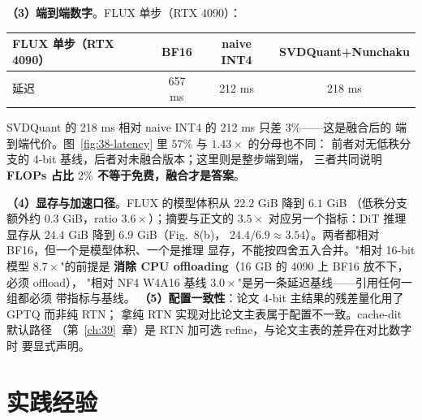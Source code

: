 \textbf{（3）端到端数字}。FLUX 单步（RTX 4090）：

\begin{center}\small
\begin{tabular}{@{}lccc@{}}
\toprule
FLUX 单步（RTX 4090） & BF16 & naive INT4 & SVDQuant+Nunchaku \\
\midrule
延迟 & 657 ms & 212 ms & 218 ms \\
\bottomrule
\end{tabular}
\end{center}

SVDQuant 的 218 ms 相对 naive INT4 的 212 ms 只差 $3\%$——这是融合后的
端到端代价。图~\ref{fig:38-latency} 里 $57\%$ 与 $1.43\times$ 的分母也不同：
前者对无低秩分支的 4-bit 基线，后者对未融合版本；这里则是整步端到端，
三者共同说明\textbf{FLOPs 占比 $2\%$ 不等于免费，融合才是答案}。

\textbf{（4）显存与加速口径}。FLUX 的模型体积从 $22.2$ GiB 降到 $6.1$ GiB
（低秩分支额外约 $0.3$ GiB，ratio $3.6\times$）；摘要与正文的 $3.5\times$
对应另一个指标：DiT 推理显存从 $24.4$ GiB 降到 $6.9$ GiB（Fig.~8(b)，
$24.4/6.9\approx3.54$）。两者都相对 BF16，但一个是模型体积、一个是推理
显存，不能按四舍五入合并。"相对 16-bit 模型 $8.7\times$"的前提是
\textbf{消除 CPU offloading}（16 GB 的 4090 上 BF16 放不下，必须 offload），
"相对 NF4 W4A16 基线 $3.0\times$"是另一条延迟基线——引用任何一组都必须
带指标与基线。
\textbf{（5）配置一致性}：论文 4-bit 主结果的残差量化用了 GPTQ 而非纯 RTN；
拿纯 RTN 实现对比论文主表属于配置不一致。cache-dit 默认路径
（第~\ref{ch:39}~章）是 RTN 加可选 refine，与论文主表的差异在对比数字时
要显式声明。

\section{实践经验}

